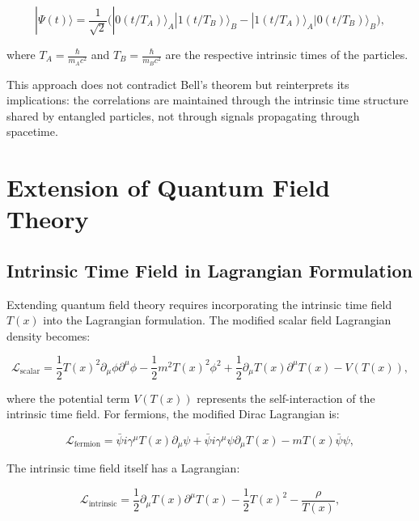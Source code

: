 \documentclass[12pt,a4paper]{article}
\newcommand{\Tfield}{T(x)}
\begin{document}
	\begin{equation}
		|\Psi(t)\rangle = \frac{1}{\sqrt{2}} \Big( |0(t/T_A)\rangle_A |1(t/T_B)\rangle_B - |1(t/T_A)\rangle_A |0(t/T_B)\rangle_B \Big),
		\label{eq:time_entangled_evolution}
	\end{equation}
	
	where $T_A = \frac{\hbar}{m_A c^2}$ and $T_B = \frac{\hbar}{m_B c^2}$ are the respective intrinsic times of the particles.
	
	This approach does not contradict Bell's theorem \cite{Bell1964, Bell1987} but reinterprets its implications: the correlations are maintained through the intrinsic time structure shared by entangled particles, not through signals propagating through spacetime.
	
	\section{Extension of Quantum Field Theory}
	\label{sec:qft_extension}
	
	\subsection{Intrinsic Time Field in Lagrangian Formulation}
	\label{subsec:intrinsic_lagrangian}
	
	Extending quantum field theory requires incorporating the intrinsic time field $\Tfield$ into the Lagrangian formulation. The modified scalar field Lagrangian density becomes:
	
	\begin{equation}
		\mathcal{L}_{\text{scalar}} = \frac{1}{2} \Tfield^2 \partial_\mu\phi \partial^\mu\phi - \frac{1}{2}m^2\Tfield^2\phi^2 + \frac{1}{2}\partial_\mu\Tfield\partial^\mu\Tfield - V(\Tfield),
		\label{eq:scalar_lagrangian}
	\end{equation}
	
	where the potential term $V(\Tfield)$ represents the self-interaction of the intrinsic time field. For fermions, the modified Dirac Lagrangian is:
	
	\begin{equation}
		\mathcal{L}_{\text{fermion}} = \bar{\psi} i \gamma^\mu \Tfield \partial_\mu \psi + \bar{\psi} i \gamma^\mu \psi \partial_\mu \Tfield - m\Tfield\bar{\psi}\psi,
		\label{eq:fermion_lagrangian}
	\end{equation}
	
	The intrinsic time field itself has a Lagrangian:
	
	\begin{equation}
		\mathcal{L}_{\text{intrinsic}} = \frac{1}{2} \partial_\mu \Tfield \partial^\mu \Tfield - \frac{1}{2}\Tfield^2 - \frac{\rho}{\Tfield},
		\label{eq:intrinsic_lagrangian}
	\end{equation}
	
\end{document}
